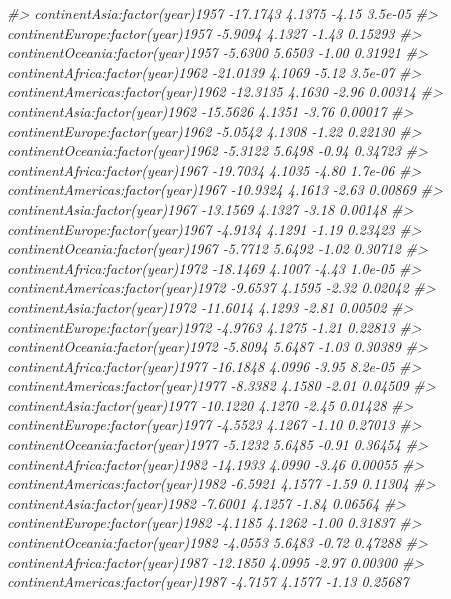 \documentclass[]{book}
\newenvironment{Shaded}{\begin{snugshade}}{\end{snugshade}}
\newcommand{\CommentTok}[1]{\textcolor[rgb]{0.56,0.35,0.01}{\textit{#1}}}
\begin{document}
\begin{Shaded}
\begin{Highlighting}[]
\CommentTok{#> continentAsia:factor(year)1957     -17.1743     4.1375   -4.15  3.5e-05}
\CommentTok{#> continentEurope:factor(year)1957    -5.9094     4.1327   -1.43  0.15293}
\CommentTok{#> continentOceania:factor(year)1957   -5.6300     5.6503   -1.00  0.31921}
\CommentTok{#> continentAfrica:factor(year)1962   -21.0139     4.1069   -5.12  3.5e-07}
\CommentTok{#> continentAmericas:factor(year)1962 -12.3135     4.1630   -2.96  0.00314}
\CommentTok{#> continentAsia:factor(year)1962     -15.5626     4.1351   -3.76  0.00017}
\CommentTok{#> continentEurope:factor(year)1962    -5.0542     4.1308   -1.22  0.22130}
\CommentTok{#> continentOceania:factor(year)1962   -5.3122     5.6498   -0.94  0.34723}
\CommentTok{#> continentAfrica:factor(year)1967   -19.7034     4.1035   -4.80  1.7e-06}
\CommentTok{#> continentAmericas:factor(year)1967 -10.9324     4.1613   -2.63  0.00869}
\CommentTok{#> continentAsia:factor(year)1967     -13.1569     4.1327   -3.18  0.00148}
\CommentTok{#> continentEurope:factor(year)1967    -4.9134     4.1291   -1.19  0.23423}
\CommentTok{#> continentOceania:factor(year)1967   -5.7712     5.6492   -1.02  0.30712}
\CommentTok{#> continentAfrica:factor(year)1972   -18.1469     4.1007   -4.43  1.0e-05}
\CommentTok{#> continentAmericas:factor(year)1972  -9.6537     4.1595   -2.32  0.02042}
\CommentTok{#> continentAsia:factor(year)1972     -11.6014     4.1293   -2.81  0.00502}
\CommentTok{#> continentEurope:factor(year)1972    -4.9763     4.1275   -1.21  0.22813}
\CommentTok{#> continentOceania:factor(year)1972   -5.8094     5.6487   -1.03  0.30389}
\CommentTok{#> continentAfrica:factor(year)1977   -16.1848     4.0996   -3.95  8.2e-05}
\CommentTok{#> continentAmericas:factor(year)1977  -8.3382     4.1580   -2.01  0.04509}
\CommentTok{#> continentAsia:factor(year)1977     -10.1220     4.1270   -2.45  0.01428}
\CommentTok{#> continentEurope:factor(year)1977    -4.5523     4.1267   -1.10  0.27013}
\CommentTok{#> continentOceania:factor(year)1977   -5.1232     5.6485   -0.91  0.36454}
\CommentTok{#> continentAfrica:factor(year)1982   -14.1933     4.0990   -3.46  0.00055}
\CommentTok{#> continentAmericas:factor(year)1982  -6.5921     4.1577   -1.59  0.11304}
\CommentTok{#> continentAsia:factor(year)1982      -7.6001     4.1257   -1.84  0.06564}
\CommentTok{#> continentEurope:factor(year)1982    -4.1185     4.1262   -1.00  0.31837}
\CommentTok{#> continentOceania:factor(year)1982   -4.0553     5.6483   -0.72  0.47288}
\CommentTok{#> continentAfrica:factor(year)1987   -12.1850     4.0995   -2.97  0.00300}
\CommentTok{#> continentAmericas:factor(year)1987  -4.7157     4.1577   -1.13  0.25687}

\end{Highlighting}
\end{Shaded}
\end{document}

